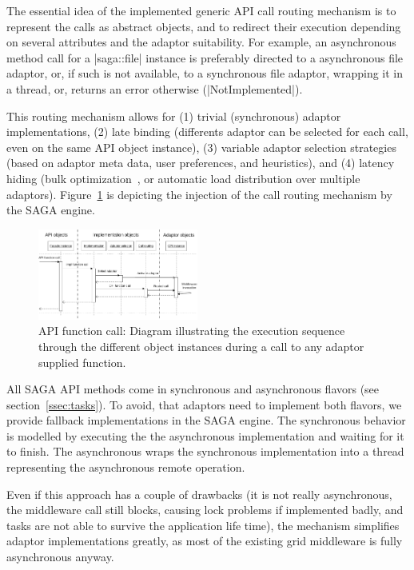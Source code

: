 The essential idea of the implemented generic API call
routing mechanism is to represent the calls as abstract objects, and
to redirect their execution depending on several attributes 
and the adaptor suitability.  For example,
an asynchronous method call for a |saga::file| instance is preferably
directed to a asynchronous file adaptor, or, if such is not available,
to a synchronous file adaptor, wrapping it in a thread,
or, returns an error otherwise (|NotImplemented|).

This routing mechanism allows for (1) trivial (synchronous) adaptor 
implementations, (2) late binding (differents adaptor can be selected
for each call, even on the same API object instance), (3) variable adaptor 
selection strategies (based on adaptor meta data, user preferences, 
and heuristics), and (4) latency hiding (bulk optimization~\cite{CS_Hirmer_06a}, 
or automatic load distribution over multiple adaptors). 
Figure~\ref{fig:object_functioncall} is depicting the injection of the
call routing mechanism by the SAGA engine.

\begin{figure}[!ht]
 \begin{center}
  \includegraphics[width=0.47\textwidth]{images/object_lifetime_functioncall}
  \up
  \caption{\label{fig:object_functioncall}
    API function call: Diagram illustrating the execution sequence through 
    the different object instances during a call to any adaptor supplied 
    function.}
 \end{center}
\end{figure}

\up
All SAGA API methods come in synchronous and asynchronous flavors
(see section~\ref{ssec:tasks}).
To avoid, that adaptors need to implement
both flavors, we provide fallback implementations in the
SAGA engine.
The synchronous behavior is modelled by 
executing the the asynchronous implementation and waiting
for it to finish.  The asynchronous wraps the synchronous
implementation into a thread representing the asynchronous 
remote operation.

Even if this approach has a couple of drawbacks (it is not really asynchronous,
the middleware call still blocks, causing lock problems if implemented badly, and
tasks are not able to survive the application life time), the mechanism 
simplifies adaptor implementations
greatly, as most of the existing grid middleware is 
fully asynchronous anyway.

